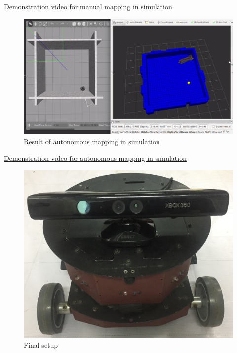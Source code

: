 \documentclass[a4paper,12pt,oneside]{book}
\begin{document}
\href{https://youtu.be/cg0Gf3kulE8}{Demonstration video for manual mapping in simulation}

\pagebreak

\begin{figure}[h]
	\centering
	\includegraphics[scale=0.35]{automap}
	\caption{Result of autonomous mapping in simulation}
\end{figure}

\href{https://youtu.be/kXyV3OpbWo8}{Demonstration video for autonomous mapping in simulation}

\vspace{1in}

\begin{figure}[h]
	\centering
	\includegraphics[scale=0.08]{bot}
	\caption{Final setup}
\end{figure}

\pagebreak
\end{document}
